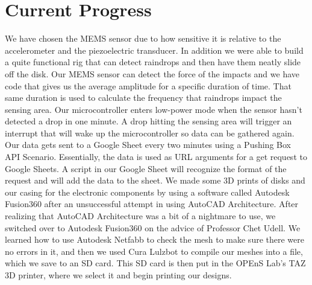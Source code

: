 \documentclass[letterpaper,10pt,draftclsnofoot,onecolumn]{article}
\begin{document}
\section{Current Progress}
We have chosen the MEMS sensor due to how sensitive it is relative to the accelerometer and the piezoelectric transducer. In addition we were able to build a quite functional rig that can detect raindrops and then have them neatly slide off the disk. Our MEMS sensor can detect the force of the impacts and we have code that gives us the average amplitude for a specific duration of time. That same duration is used to calculate the frequency that raindrops impact the sensing area. Our microcontroller enters low-power mode when the sensor hasn't detected a drop in one minute. A drop hitting the sensing area will trigger an interrupt that will wake up the microcontroller so data can be gathered again. Our data gets sent to a Google Sheet every two minutes using a Pushing Box API Scenario. Essentially, the data is used as URL arguments for a get request to Google Sheets. A script in our Google Sheet will recognize the format of the request and will add the data to the sheet.
\newline
\newline
We made some 3D prints of disks and our casing for the electronic components by using a software called Autodesk Fusion360 after an unsuccessful attempt in using AutoCAD Architecture. After realizing that AutoCAD Architecture was a bit of a nightmare to use, we switched over to Autodesk Fusion360 on the advice of Professor Chet Udell. We learned how to use Autodesk Netfabb to check the mesh to make sure there were no errors in it, and then we used Cura Lulzbot to compile our meshes into a file, which we save to an SD card. This SD card is then put in the OPEnS Lab's TAZ 3D printer, where we select it and begin printing our designs.
\end{document}
